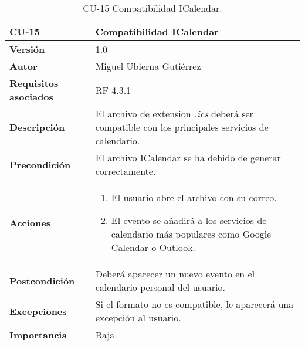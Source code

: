 \begin{table}[p]
	\centering
	\begin{tabularx}{\linewidth}{ p{} p{} }
		\toprule
		\textbf{CU-15}    & \textbf{Compatibilidad ICalendar}\\
		\toprule
		\textbf{Versión}              & 1.0    \\
		\textbf{Autor}                & Miguel Ubierna Gutiérrez \\
		\textbf{Requisitos asociados} & RF-4.3.1  \\
		\textbf{Descripción}          & El archivo de extension \textit{.ics} deberá ser compatible con los principales servicios de calendario.\\
		\textbf{Precondición}         & El archivo ICalendar se ha debido de generar correctamente.\\
		\textbf{Acciones}             &
		\begin{enumerate}
			\def\labelenumi{\arabic{enumi}.}
			\tightlist
                \item El usuario abre el archivo con su correo.
                \item El evento se añadirá a los servicios de calendario más populares como Google Calendar o Outlook.
		\end{enumerate}\\
		\textbf{Postcondición}        & Deberá aparecer un nuevo evento en el calendario personal del usuario. \\
		\textbf{Excepciones}          & Si el formato no es compatible, le aparecerá una excepción al usuario. \\
		\textbf{Importancia}          & Baja.  \\
		\bottomrule
	\end{tabularx}
	\caption{CU-15 Compatibilidad ICalendar.}
\end{table}



